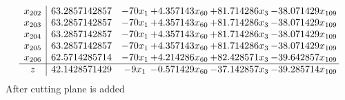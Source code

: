 \documentclass[11pt]{article}
\begin{document}
\[\begin{array}{c| c c@{\hskip 2pt} c@{\hskip 2pt} c@{\hskip 2pt} c@{\hskip 2pt} }
 x_{202}   &  63.2857142857 & -70 x_{1} & + 4.357143 x_{60} & + 81.714286 x_{3} & -38.071429 x_{109}\\
 x_{203}   &  63.2857142857 & -70 x_{1} & + 4.357143 x_{60} & + 81.714286 x_{3} & -38.071429 x_{109}\\
 x_{204}   &  63.2857142857 & -70 x_{1} & + 4.357143 x_{60} & + 81.714286 x_{3} & -38.071429 x_{109}\\
 x_{205}   &  63.2857142857 & -70 x_{1} & + 4.357143 x_{60} & + 81.714286 x_{3} & -38.071429 x_{109}\\
 x_{206}   &  62.5714285714 & -70 x_{1} & + 4.214286 x_{60} & + 82.428571 x_{3} & -39.642857 x_{109}\\
\hline
z    &  42.1428571429 & -9 x_{1} & -0.571429 x_{60} & -37.142857 x_{3} & -39.285714 x_{109}\\
\end{array}\]
 After cutting plane is added 
\end{document}
